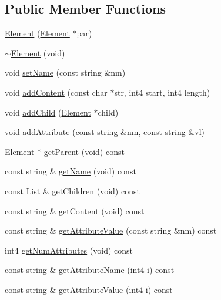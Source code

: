 \subsection*{Public Member Functions}
\begin{DoxyCompactItemize}
\item 
\mbox{\hyperlink{class_element_a4b15c730a1f2705efc3f302ebf850649}{Element}} (\mbox{\hyperlink{class_element}{Element}} $\ast$par)
\item 
\mbox{\hyperlink{class_element_a2d1e1ab54ade3240c7fd99773de13d24}{$\sim$\+Element}} (void)
\item 
void \mbox{\hyperlink{class_element_a341bf668e56bdb5afce663d61f3ca011}{set\+Name}} (const string \&nm)
\item 
void \mbox{\hyperlink{class_element_aaad8f8e819869b0906c10c3e2829ec12}{add\+Content}} (const char $\ast$str, int4 start, int4 length)
\item 
void \mbox{\hyperlink{class_element_a5e5de37f6b79a3a952d021ba15b3912d}{add\+Child}} (\mbox{\hyperlink{class_element}{Element}} $\ast$child)
\item 
void \mbox{\hyperlink{class_element_a49f5e63e04bfc793832db7091553abf2}{add\+Attribute}} (const string \&nm, const string \&vl)
\item 
\mbox{\hyperlink{class_element}{Element}} $\ast$ \mbox{\hyperlink{class_element_a6655a8693d105f46eeb0bef0194b002d}{get\+Parent}} (void) const
\item 
const string \& \mbox{\hyperlink{class_element_a7b3e52639fcd08f69cc7480dfe9fd3b2}{get\+Name}} (void) const
\item 
const \mbox{\hyperlink{xml_8hh_ab5ab62f46b3735557c125f91b40ac155}{List}} \& \mbox{\hyperlink{class_element_ad3279a8cab4c21c79abb3c20f706ffca}{get\+Children}} (void) const
\item 
const string \& \mbox{\hyperlink{class_element_a97102776a2f1831f3ff63a3b8baf9fdb}{get\+Content}} (void) const
\item 
const string \& \mbox{\hyperlink{class_element_aa7c399eff3cfca934ee7fb9cc559d039}{get\+Attribute\+Value}} (const string \&nm) const
\item 
int4 \mbox{\hyperlink{class_element_a0d3ecdbc2781958e4baa06c9d3c4316c}{get\+Num\+Attributes}} (void) const
\item 
const string \& \mbox{\hyperlink{class_element_a008a28024c815531ef73e1041555ca28}{get\+Attribute\+Name}} (int4 i) const
\item 
const string \& \mbox{\hyperlink{class_element_a24bda497430edf8e801ec22f17f1dc88}{get\+Attribute\+Value}} (int4 i) const
\end{DoxyCompactItemize}
